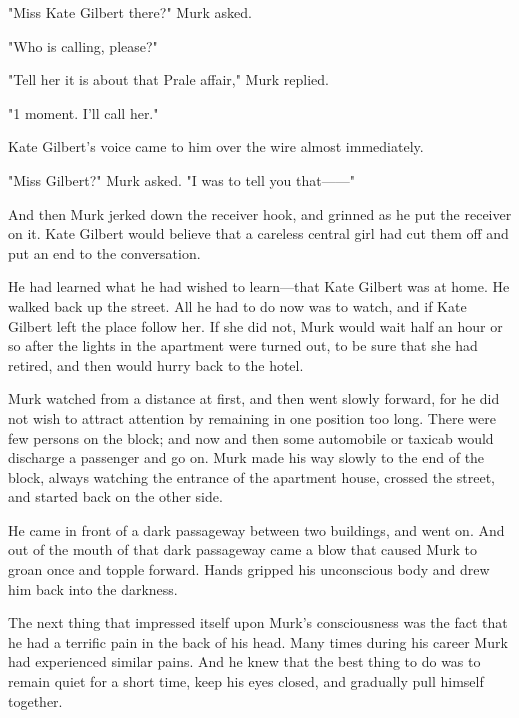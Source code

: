 \documentclass{novel}
\begin{document}
"Miss Kate Gilbert there?" Murk asked.

"Who is calling, please?"

"Tell her it is about that Prale affair," Murk replied.

"1 moment. I'll call her."

Kate Gilbert's voice came to him over the wire almost immediately.

"Miss Gilbert?" Murk asked. "I was to tell you that------"

And then Murk jerked down the receiver hook, and grinned as he put the receiver on it. Kate Gilbert would believe that a careless central girl had cut them off and put an end to the conversation.

He had learned what he had wished to learn---that Kate Gilbert was at home. He walked back up the street. All he had to do now was to watch, and if Kate Gilbert left the place follow her. If she did not, Murk would wait half an hour or so after the lights in the apartment were turned out, to be sure that she had retired, and then would hurry back to the hotel.

Murk watched from a distance at first, and then went slowly forward, for he did not wish to attract attention by remaining in one position too long. There were few persons on the block; and now and then some automobile or taxicab would discharge a passenger and go on. Murk made his way slowly to the end of the block, always watching the entrance of the apartment house, crossed the street, and started back on the other side.

He came in front of a dark passageway between two buildings, and went on. And out of the mouth of that dark passageway came a blow that caused Murk to groan once and topple forward. Hands gripped his unconscious body and drew him back into the darkness.

\vspace{2\nbs}
\clearpage
\thispagestyle{empty}

\begin{ChapterStart}
\vspace{3\nbs}
\end{ChapterStart}
    
The next thing that impressed itself upon Murk's consciousness was the fact that he had a terrific pain in the back of his head. Many times during his career Murk had experienced similar pains. And he knew that the best thing to do was to remain quiet for a short time, keep his eyes closed, and gradually pull himself together.
\end{document}
